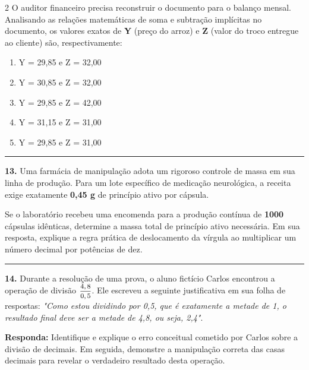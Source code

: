 \documentclass[twoside, 10pt, a4paper]{article}
\newlength{\espacoPreQuestao}
\newlength{\espacoQuestao}
\begin{document}
\begin{multicols*}{2}
O auditor financeiro precisa reconstruir o documento para o balanço mensal. Analisando as relações matemáticas de soma e subtração implícitas no documento, os valores exatos de \textbf{Y} (preço do arroz) e \textbf{Z} (valor do troco entregue ao cliente) são, respectivamente:
\begin{enumerate}[label=\alph*)]
    \item Y = 29,85 e Z = 32,00
    \item Y = 30,85 e Z = 32,00
    \item Y = 29,85 e Z = 42,00
    \item Y = 31,15 e Z = 31,00
    \item Y = 29,85 e Z = 31,00
\end{enumerate}
\par\vspace{\espacoQuestao}
\noindent\textcolor{CorLinha}{\rule{\linewidth}{0.5pt}} 
\par\vspace{\espacoPreQuestao}
\textbf{13.} Uma farmácia de manipulação adota um rigoroso controle de massa em sua linha de produção. Para um lote específico de medicação neurológica, a receita exige exatamente \textbf{0,45 g} de princípio ativo por cápsula. 

Se o laboratório recebeu uma encomenda para a produção contínua de \textbf{1000} cápsulas idênticas, determine a massa total de princípio ativo necessária. Em sua resposta, explique a regra prática de deslocamento da vírgula ao multiplicar um número decimal por potências de dez.
\par\vspace{\espacoQuestao}

\noindent\textcolor{CorLinha}{\rule{\linewidth}{0.5pt}}
\par\vspace{\espacoPreQuestao}
\textbf{14.} Durante a resolução de uma prova, o aluno fictício Carlos encontrou a operação de divisão $ \mfrac{4,8}{0,5} $. Ele escreveu a seguinte justificativa em sua folha de respostas: \textit{"Como estou dividindo por 0,5, que é exatamente a metade de 1, o resultado final deve ser a metade de 4,8, ou seja, 2,4"}.
\begin{boxresponda}
\textbf{Responda:} Identifique e explique o erro conceitual cometido por Carlos sobre a divisão de decimais. Em seguida, demonstre a manipulação correta das casas decimais para revelar o verdadeiro resultado desta operação.
\end{boxresponda}
\par\vspace{\espacoQuestao}


\end{multicols*}
\end{document}
